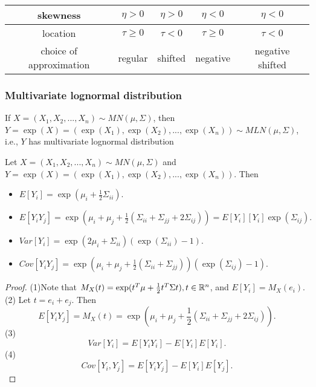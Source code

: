 \begin{refsection}
\begin{note}
	
\begin{center}
	\begin{tabular}{|c|c|c|c|c|}
		\hline
		skewness                & $\eta > 0$   & $\eta>0$   & $\eta<0$      & $\eta<0$         \\ \hline
		location                & $\tau\geq 0$ & $\tau < 0$ & $\tau \geq 0$ & $\tau < 0$       \\ \hline
		choice of approximation & regular      & shifted    & negative      & negative shifted \\ \hline
	\end{tabular}

\end{center}	
\end{note}

\subsubsection{Multivariate lognormal distribution}

\begin{definition}\label{ch:theory-of-statistics:def:multivariateLognormalDistribution}
If $X=(X_1,X_2,...,X_n)\sim MN(\mu,\Sigma)$, then $Y=\exp(X)=(\exp(X_1),\exp(X_2),...,\exp(X_n)) \sim MLN(\mu, \Sigma)$,
i.e., $Y$ has multivariate lognormal distribution
\end{definition}

\begin{lemma}\label{ch:theory-of-statistics:th:BasicPropertiesMultivariateLognormal}
Let $X=(X_1,X_2,...,X_n)\sim MN(\mu, \Sigma)$ and $Y = \exp(X)=(\exp(X_1),\exp(X_2),...,\exp(X_n))$. Then
\begin{itemize}
	\item $E[Y_i] = \exp(\mu_i + \frac{1}{2}\Sigma_{ii})$.
	\item $E[Y_iY_j] = \exp(\mu_i+\mu_j + \frac{1}{2}(\Sigma_{ii} + \Sigma_{jj} + 2\Sigma_{ij})) = E[Y_i][Y_i]\exp(\Sigma_{ij}).$
	\item $Var[Y_i] = \exp(2\mu_i + \Sigma_{ii})(\exp(\Sigma_{ii}) - 1).$
	\item $Cov[Y_iY_j] = \exp(\mu_i+\mu_j + \frac{1}{2}(\Sigma_{ii} + \Sigma_{jj}))(\exp(\Sigma_{ij}) - 1).$
\end{itemize}	
	
\end{lemma}
\begin{proof}
(1)Note that $M_X(t) = \exp(t^T\mu + \frac{1}{2}t^T \Sigma t), t\in \mathbb{R}^n$, and $E[Y_i] = M_X(e_i)$.
(2) Let $t = e_i+e_j$. Then $$E[Y_iY_j] = M_X(t) = \exp(\mu_i+\mu_j + \frac{1}{2}(\Sigma_{ii} + \Sigma_{jj} + 2\Sigma_{ij})).$$
(3) $$Var[Y_i] = E[Y_iY_i]- E[Y_i]E[Y_i].$$
(4) $$Cov[Y_i,Y_j] = E[Y_iY_j]- E[Y_i]E[Y_j].$$
\end{proof}




\end{refsection}

